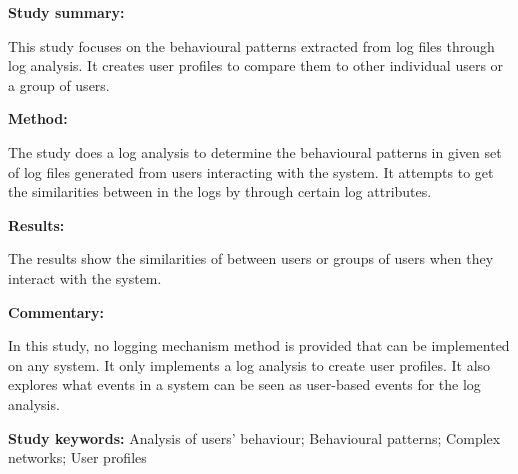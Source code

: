 \begin{tcolorbox}[colback=gray!5!white, colframe=pastelgreen!40!black, title=User behavioural patterns and reduced user profiles extracted from log files\cite{Slaninova2014}]
	\begin{minipage}[t]{0.25\textwidth}
		\textbf{Study summary:}
	\end{minipage}
	\hfill
	\begin{minipage}[t]{0.65\textwidth}
		This study focuses on the behavioural patterns extracted from log files through log
		analysis. It creates user profiles to compare them to other individual users or a group of
		users.
	\end{minipage}

	\vspace{0.75em} 

	\begin{minipage}[t]{0.25\textwidth}
		\textbf{Method:}
	\end{minipage}
	\hfill
	\begin{minipage}[t]{0.65\textwidth}
		The study does a log analysis to determine the behavioural patterns in given set of log files generated from users interacting with the system. It attempts to get the similarities between in the logs by through certain log attributes.
	\end{minipage}

	\vspace{0.75em} 

	\begin{minipage}[t]{0.25\textwidth}
		\textbf{Results:}
	\end{minipage}
	\hfill
	\begin{minipage}[t]{0.65\textwidth}
		The results show the similarities of between users or groups of users when they interact with the system.	
	\end{minipage}

	\vspace{0.75em} 

	\begin{minipage}[t]{0.25\textwidth}
		\textbf{Commentary:}
	\end{minipage}
	\hfill
	\begin{minipage}[t]{0.65\textwidth}
		In this study, no logging mechanism method is provided that can be implemented on any
		system. It only implements a log analysis to create user profiles. It also explores what
		events in a system can be seen as user-based events for the log analysis.
	\end{minipage}
	\tcblower
	\textbf{Study keywords:} Analysis of users' behaviour; Behavioural patterns; Complex networks;
	User profiles
\end{tcolorbox}

